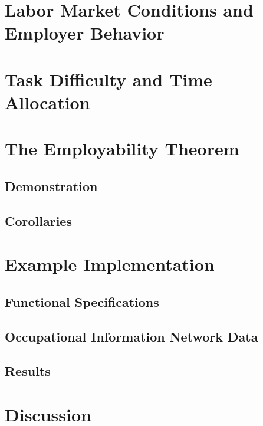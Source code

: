 \documentclass[nonatbib]{elsarticle}
\begin{document}
\SCA
\ORA
\OCA
\OCL

\section{Labor Market Conditions and Employer Behavior}
\RA
\HA
\OEL
\LMCA

\section{Task Difficulty and Time Allocation}
\TDA


\section{The Employability Theorem}
\subsection{Demonstration}
\PET

\subsection{Corollaries}
\AEC

\OCC

\ACC


\section{Example Implementation}
\subsection{Functional Specifications}
\subsection{Occupational Information Network Data}
\subsection{Results}


\section{Discussion}
\end{document}
